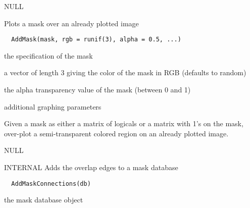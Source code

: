 \documentclass[a4paper]{book}
\begin{document}
%
\begin{Value}
NULL
\end{Value}
%
\begin{Description}\relax
Plots a mask over an already plotted image
\end{Description}
%
\begin{Usage}
\begin{verbatim}
  AddMask(mask, rgb = runif(3), alpha = 0.5, ...)
\end{verbatim}
\end{Usage}
%
\begin{Arguments}
\begin{ldescription}
\item[\code{mask}] the specification of the mask

\item[\code{rgb}] a vector of length 3 giving the color of the
mask in RGB (defaults to random)

\item[\code{alpha}] the alpha transparency value of the mask
(between 0 and 1)

\item[\code{...}] additional graphing parameters
\end{ldescription}
\end{Arguments}
%
\begin{Details}\relax
Given a mask as either a matrix of logicals or a matrix
with 1's on the mask, over-plot a semi-transparent
colored region on an already plotted image.
\end{Details}
%
\begin{Value}
NULL
\end{Value}
%
\begin{Description}\relax
INTERNAL Adds the overlap edges to a mask database
\end{Description}
%
\begin{Usage}
\begin{verbatim}
  AddMaskConnections(db)
\end{verbatim}
\end{Usage}
%
\begin{Arguments}
\begin{ldescription}
\item[\code{db}] the mask database object
\end{ldescription}
\end{Arguments}
\end{document}

